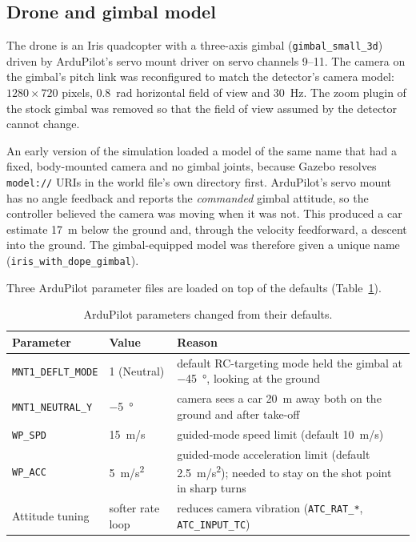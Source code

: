 \documentclass[11pt,a4paper]{report}
\begin{document}
\subsection{Drone and gimbal model}
The drone is an Iris quadcopter with a three-axis gimbal (\texttt{gimbal\_small\_3d})
driven by ArduPilot's servo mount driver on servo channels 9--11. The camera on
the gimbal's pitch link was reconfigured to match the detector's camera model:
$1280\times720$ pixels, \SI{0.8}{rad} horizontal field of view and \SI{30}{Hz}.
The zoom plugin of the stock gimbal was removed so that the field of view
assumed by the detector cannot change.

An early version of the simulation loaded a model of the same name that had a
fixed, body-mounted camera and no gimbal joints, because Gazebo resolves
\texttt{model://} URIs in the world file's own directory first. ArduPilot's
servo mount has no angle feedback and reports the \emph{commanded} gimbal
attitude, so the controller believed the camera was moving when it was not.
This produced a car estimate \SI{17}{m} below the ground and, through the
velocity feedforward, a descent into the ground. The gimbal-equipped model
was therefore given a unique name (\texttt{iris\_with\_dope\_gimbal}).

Three ArduPilot parameter files are loaded on top of the defaults
(Table~\ref{tab:ardupilot-params}).

\begin{table}[htbp]
  \centering
  \caption{ArduPilot parameters changed from their defaults.}
  \label{tab:ardupilot-params}
  \begin{tabular}{@{}llp{75mm}@{}}
    \toprule
    Parameter & Value & Reason \\
    \midrule
    \texttt{MNT1\_DEFLT\_MODE} & 1 (Neutral) & default RC-targeting mode held the gimbal at \SI{-45}{\degree}, looking at the ground \\
    \texttt{MNT1\_NEUTRAL\_Y} & \SI{-5}{\degree} & camera sees a car \SI{20}{m} away both on the ground and after take-off \\
    \texttt{WP\_SPD} & \SI{15}{m/s} & guided-mode speed limit (default \SI{10}{m/s}) \\
    \texttt{WP\_ACC} & \SI{5}{m/s^2} & guided-mode acceleration limit (default \SI{2.5}{m/s^2}); needed to stay on the shot point in sharp turns \\
    Attitude tuning & softer rate loop & reduces camera vibration (\texttt{ATC\_RAT\_*}, \texttt{ATC\_INPUT\_TC}) \\
    \bottomrule
  \end{tabular}
\end{table}
\end{document}
